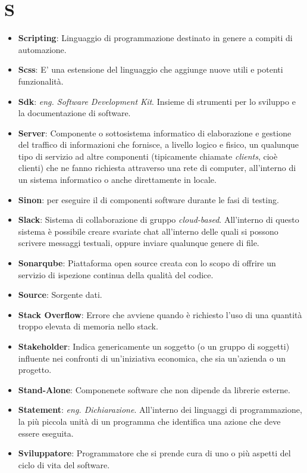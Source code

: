 \section*{S}
\begin{itemize}
	\item
	\textbf{Scripting}: Linguaggio di programmazione destinato in genere a compiti di automazione.
	\item
	\textbf{Scss}: E' una estensione del linguaggio  che aggiunge nuove utili e potenti funzionalità.
	\item
	\textbf{Sdk}: \textit{eng. Software Development Kit}. Insieme di strumenti per lo sviluppo e la documentazione di software.
	\item
	\textbf{Server}: Componente o sottosistema informatico di elaborazione e gestione del traffico di informazioni che fornisce, a livello logico e fisico, un qualunque tipo di servizio ad altre componenti (tipicamente chiamate \textit{clients}, cioè clienti) che ne fanno richiesta attraverso una rete di computer, all'interno di un sistema informatico o anche direttamente in locale.
	\item
	\textbf{Sinon}:  per eseguire il  di componenti software durante le fasi di testing.
	\item
	\textbf{Slack}: Sistema di collaborazione di gruppo \textit{cloud-based}. All'interno di questo sistema è possibile creare svariate chat all'interno delle quali si possono scrivere messaggi testuali, oppure inviare qualunque genere di file.
	\item
	\textbf{Sonarqube}: Piattaforma open source creata con lo scopo di offrire un servizio di ispezione continua della qualità del codice.
	\item
	\textbf{Source}: Sorgente dati.
	\item
	\textbf{Stack Overflow}: Errore che avviene quando è richiesto l'uso di una quantità troppo elevata di memoria nello stack.
	\item
	\textbf{Stakeholder}: Indica genericamente un soggetto (o un gruppo di soggetti) influente nei confronti di un'iniziativa economica, che sia un'azienda o un progetto.
	\item
	\textbf{Stand-Alone}: Componenete software che non dipende da librerie esterne.
	\item
	\textbf{Statement}: \textit{eng. Dichiarazione}. All'interno dei linguaggi di programmazione, la più piccola unità di un programma che identifica una azione che deve essere eseguita.
	\item
	\textbf{Sviluppatore}: Programmatore che si prende cura di uno o più aspetti del ciclo di vita del software.
\end{itemize}
\newpage